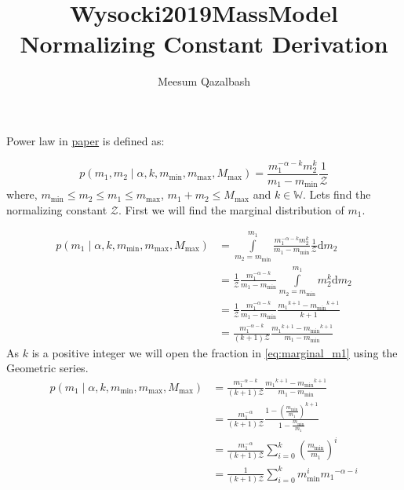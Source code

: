 \documentclass{article}
\title{Wysocki2019MassModel Normalizing Constant Derivation}
\author{Meesum Qazalbash}
\newcommand{\mmin}{m_\text{min}}
\newcommand{\mmax}{m_\text{max}}
\newcommand{\Mmax}{M_\text{max}}
\newcommand{\Z}{\mathcal{Z}}
\newcommand{\diff}[1]{\mathrm{d}{#1}}
\begin{document}
\maketitle

Power law in \href{https://arxiv.org/abs/1805.06442}{paper} is defined as:

\begin{equation}
    \label{eq:powerlaw}
    p(m_1,m_2\mid\alpha,k,\mmin,\mmax,\Mmax)=\frac{m_1^{-\alpha-k}m_2^k}{m_1-\mmin}\frac{1}{\Z}
\end{equation}
where, \(\mmin\le m_2\le m_1\le \mmax\), \(m_1+m_2\le\Mmax\) and \(k\in\mathbb{W}\). Lets find the normalizing constant \(\Z\). First we will find the marginal distribution of \(m_1\).

\begin{align}
    p(m_1\mid\alpha,k,\mmin,\mmax,\Mmax) & = \int\limits_{m_2=\mmin}^{m_1}\frac{m_1^{-\alpha-k}m_2^k}{m_1-\mmin}\frac{1}{\Z}\diff{m_2}         \\
                                         & = \frac{1}{\Z}\frac{m_1^{-\alpha-k}}{m_1-\mmin}\int\limits_{m_2=\mmin}^{m_1}m_2^k\diff{m_2}         \\
                                         & = \frac{1}{\Z}\frac{m_1^{-\alpha-k}}{m_1-\mmin}\frac{{m_1}^{k+1}-{\mmin}^{k+1}}{k+1}                \\
                                         & = \frac{m_1^{-\alpha-k}}{(k+1)\Z}\frac{{m_1}^{k+1}-{\mmin}^{k+1}}{m_1-\mmin} \label{eq:marginal_m1}
\end{align}
As \(k\) is a positive integer we will open the fraction in \ref{eq:marginal_m1} using the Geometric series.
\begin{align}
    p(m_1\mid\alpha,k,\mmin,\mmax,\Mmax) & = \frac{m_1^{-\alpha-k}}{(k+1)\Z}\frac{{m_1}^{k+1}-{\mmin}^{k+1}}{m_1-\mmin}                                                    \\
                                         & = \frac{m_1^{-\alpha}}{(k+1)\Z}\frac{1-{\left(\displaystyle\frac{\mmin}{m_1}\right)}^{k+1}}{1-{\displaystyle\frac{\mmin}{m_1}}} \\
                                         & = \frac{m_1^{-\alpha}}{(k+1)\Z}\sum\limits_{i=0}^{k}{\left(\frac{\mmin}{m_1}\right)}^{i}                                        \\
                                         & = \frac{1}{(k+1)\Z}\sum\limits_{i=0}^{k}{\mmin^{i}{m_1}^{-\alpha-i}}
\end{align}
\end{document}
